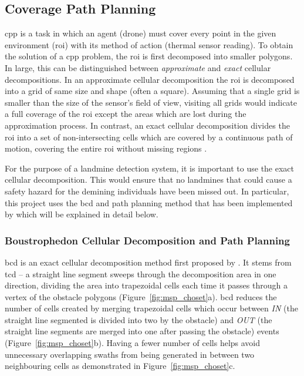 \subsection{Coverage Path Planning}
\label{sec:msp_cpp}

\gls{cpp} is a task in which an agent (drone) must cover every point in the given environment (\gls{roi}) with its method of action (thermal sensor reading). To obtain the solution of a \gls{cpp} problem, the \gls{roi} is first decomposed into smaller polygons. In large, this can be distinguished between \textit{approximate} and \textit{exact} cellular decompositions. In an approximate cellular decomposition the \gls{roi} is decomposed into a grid of same size and shape (often a square). Assuming that a single grid is smaller than the size of the sensor's field of view, visiting all grids would indicate a full coverage of the \gls{roi} except the areas which are lost during the approximation process. In contrast, an exact cellular decomposition divides the \gls{roi} into a set of non-intersecting cells which are covered by a continuous path of motion, covering the entire \gls{roi} without missing regions \cite{choset2001surveycpp}. 

For the purpose of a landmine detection system, it is important to use the exact cellular decomposition. This would ensure that no landmines that could cause a safety hazard for the demining individuals have been missed out. In particular, this project uses the \gls{bcd} and path planning method that has been implemented by \cite{bahnemann2021cpp} which will be explained in detail below.  

\subsubsection{Boustrophedon Cellular Decomposition and Path Planning}

\gls{bcd} is an exact cellular decomposition method first proposed by \cite{choset1998bcd}. It stems from \gls{tcd} -- a straight line segment sweeps through the decomposition area in one direction, dividing the area into trapezoidal cells each time it passes through a vertex of the obstacle polygons (Figure~\ref{fig:msp_choset}a). \gls{bcd} reduces the number of cells created by merging trapezoidal cells which occur between \textit{IN} (the straight line segmented is divided into two by the obstacle) and \textit{OUT} (the straight line segments are merged into one after passing the obstacle) events (Figure~\ref{fig:msp_choset}b). Having a fewer number of cells helps avoid unnecessary overlapping swaths from being generated in between two neighbouring cells as demonstrated in Figure~\ref{fig:msp_choset}c. 


